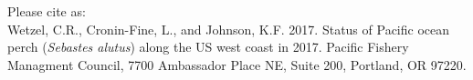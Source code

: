 \begin{center}
\vspace{.3cm}

\newpage

\vspace{3cm}

Please cite as:\\

Wetzel, C.R., Cronin-Fine, L., and Johnson, K.F. 2017. Status of Pacific ocean perch (\textit{Sebastes alutus}) along the US west coast in 2017. Pacific Fishery Managment Council, 7700 Ambassador Place NE, Suite 200, Portland, OR 97220. 

\vspace{3cm}

\maketitle






\setcounter{page}{1}
\end{center}


